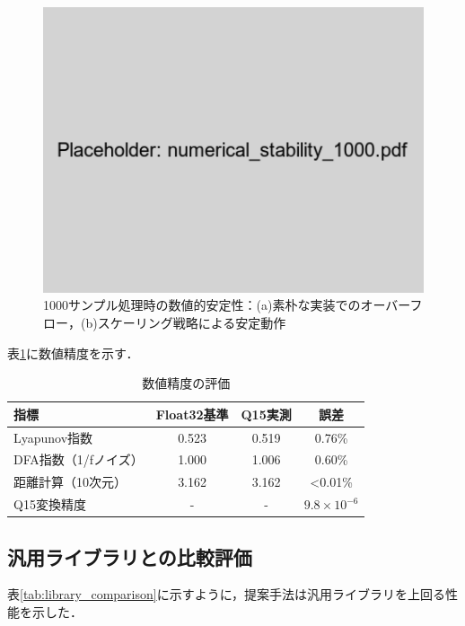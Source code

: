 \documentclass[paper]{ieice}
\begin{document}
\begin{figure}[t]
\centering
\includegraphics[width=0.85\linewidth]{numerical_stability_1000.pdf}
\caption{1000サンプル処理時の数値的安定性：(a)素朴な実装でのオーバーフロー，(b)スケーリング戦略による安定動作}
\label{fig:stability}
\end{figure}

表\ref{tab:accuracy}に数値精度を示す．

\begin{table}[t]
\caption{数値精度の評価}
\label{tab:accuracy}
\centering
\begin{tabular}{lccc}
\toprule
指標 & Float32基準 & Q15実測 & 誤差 \\
\midrule
Lyapunov指数 & 0.523 & 0.519 & 0.76\% \\
DFA指数（1/fノイズ） & 1.000 & 1.006 & 0.60\% \\
距離計算（10次元） & 3.162 & 3.162 & <0.01\% \\
Q15変換精度 & - & - & $9.8 \times 10^{-6}$ \\
\bottomrule
\end{tabular}
\end{table}

\subsection{汎用ライブラリとの比較評価}

表\ref{tab:library_comparison}に示すように，提案手法は汎用ライブラリを上回る性能を示した．
\end{document}
